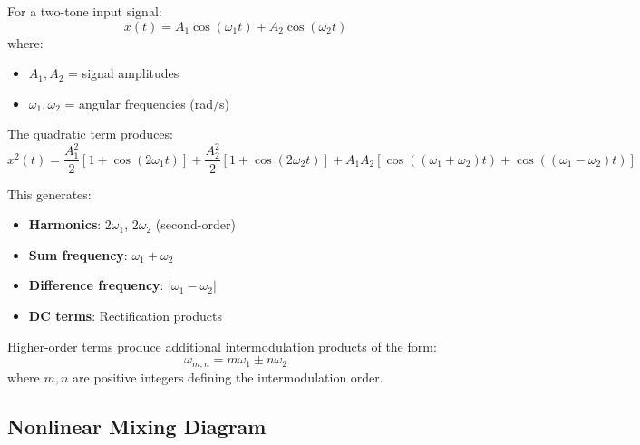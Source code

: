 For a two-tone input signal:
\begin{equation}
\label{eq:two-tone-input}
x(t) = A_1 \cos(\omega_1 t) + A_2 \cos(\omega_2 t)
\end{equation}
where:
\begin{itemize}
\item $A_1, A_2$ = signal amplitudes
\item $\omega_1, \omega_2$ = angular frequencies (rad/s)
\end{itemize}

The quadratic term produces:
\begin{equation}
\label{eq:quadratic-mixing}
x^2(t) = \frac{A_1^2}{2}[1 + \cos(2\omega_1 t)] + \frac{A_2^2}{2}[1 + \cos(2\omega_2 t)] + A_1 A_2[\cos((\omega_1+\omega_2)t) + \cos((\omega_1-\omega_2)t)]
\end{equation}

This generates:
\begin{itemize}
\item \textbf{Harmonics}: $2\omega_1$, $2\omega_2$ (second-order)
\item \textbf{Sum frequency}: $\omega_1 + \omega_2$
\item \textbf{Difference frequency}: $|\omega_1 - \omega_2|$
\item \textbf{DC terms}: Rectification products
\end{itemize}

Higher-order terms produce additional intermodulation products of the form:
\begin{equation}
\label{eq:imd-products}
\omega_{m,n} = m\omega_1 \pm n\omega_2
\end{equation}
where $m, n$ are positive integers defining the intermodulation order.

\subsection{Nonlinear Mixing Diagram}

